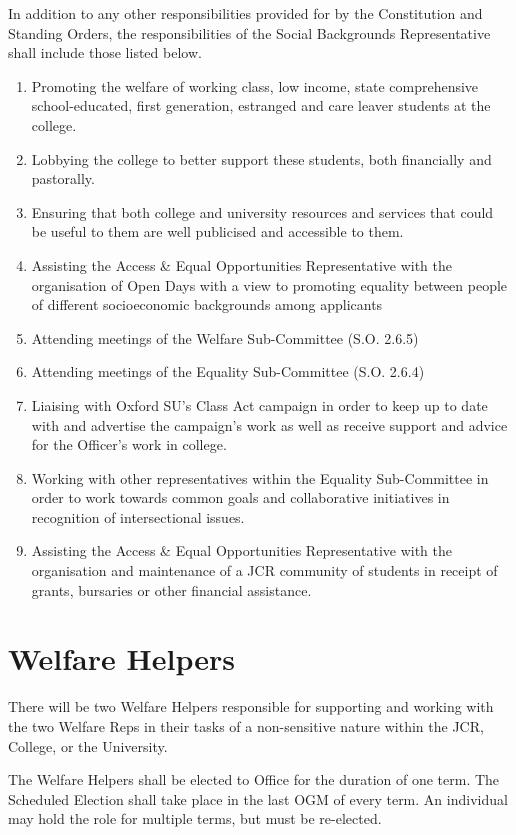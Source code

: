 \npara	In addition to any other responsibilities provided for by the Constitution and Standing Orders, the responsibilities of the Social Backgrounds Representative shall include those listed below. 
\begin{enumerate}
    \item Promoting the welfare of working class, low income, state comprehensive school-educated, first generation, estranged and care leaver students at the college.
    \item Lobbying the college to better support these students, both financially and pastorally.
    \item Ensuring that both college and university resources and services that could be useful to them are well publicised and accessible to them.
    \item Assisting the Access \& Equal Opportunities Representative with the organisation of Open Days with a view to promoting equality between people of different socioeconomic backgrounds among applicants
    \item Attending meetings of the Welfare Sub-Committee (S.O. 2.6.5)
    \item Attending meetings of the Equality Sub-Committee (S.O. 2.6.4)
    \item Liaising with Oxford SU’s Class Act campaign in order to keep up to date with and advertise the campaign’s work as well as receive support and advice for the Officer’s work in college.
    \item Working with other representatives within the Equality Sub-Committee in order to work towards common goals and collaborative initiatives in recognition of intersectional issues.
    \item Assisting the Access \& Equal Opportunities Representative with the organisation and maintenance of a JCR community of students in receipt of grants, bursaries or other financial assistance.
\end{enumerate}

\section{Welfare Helpers}
\npara There will be two Welfare Helpers responsible for supporting and working with the two Welfare Reps in their tasks of a non-sensitive nature within the JCR, College, or the University.

\npara The Welfare Helpers shall be elected to Office for the duration of one term. The Scheduled Election shall take place in the last OGM of every term. An individual may hold the role for multiple terms, but must be re-elected.

